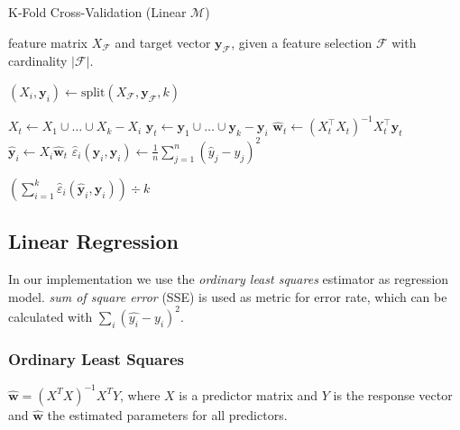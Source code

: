 \documentclass[a4paper, twocolumn]{article}
\begin{document}
            \begin{algorithm}
                \caption{K-Fold Cross-Validation (Linear $\mathcal{M}$)}
            \label{alg:kfoldcv}
            \begin{algorithmic}[1]
                \REQUIRE feature matrix $X_\mathcal{F}$ and target vector $\mathbf{y_\mathcal{F}}$,
                        given a feature selection $\mathcal{F}$ with cardinality $|\mathcal{F}|$.

                \STATE $(X_i, \mathbf{y}_i) \leftarrow \mathrm{split}(X_\mathcal{F}, \mathbf{y}_\mathcal{F}, k)$ 

                    \STATE $X_t \leftarrow X_1 \cup \dots \cup X_k - X_i$ 
                    \STATE $\mathbf{y}_t \leftarrow \mathbf{y}_1 \cup \dots \cup \mathbf{y}_k - \mathbf{y}_i$ 
                    \STATE $\mathbf{\hat{w}}_t \leftarrow (X_t^\intercal X^{}_t)^{-1} X_t^\intercal \mathbf{y}^{}_t$ 
                    \STATE $\mathbf{\hat{y}}^{}_i \leftarrow X^{}_i \mathbf{\hat{w}}^{}_t$ 
                    \STATE $\hat{\varepsilon}_i(\mathbf{\hat{y}}_i, \mathbf{y}_i) \leftarrow \frac{1}{n}\sum_{j=1}^{n}(\hat{y}_j - y_j)^2$
                \ENDFOR

                \RETURN $(\sum_{i=1}^k{\hat{\varepsilon}_i(\mathbf{\hat{y}}_i, \mathbf{y}_i)}) \div k$
            \end{algorithmic}
            \end{algorithm}

        \subsection*{Linear Regression}

            In our implementation we use the \emph{ordinary least squares} estimator as regression model. \emph{sum of square error} (SSE) is used as metric for error rate, which can be calculated with $\sum_{i}{(\hat{y_i} - y_i)^2}$.

        \subsubsection*{Ordinary Least Squares}

            \(\hat{\mathbf{w}} = (X^T X)^{-1} X^T Y\), where $X$ is a predictor matrix and $Y$ is the response vector and $\hat{\mathbf{w}}$ the estimated parameters for all predictors.
\end{document}
